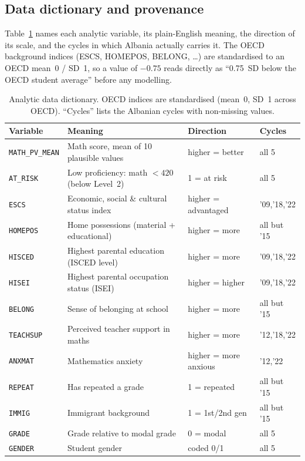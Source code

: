 \subsection{Data dictionary and provenance}
Table~\ref{tab:datadict} names each analytic variable, its plain-English meaning, the
direction of its scale, and the cycles in which Albania actually carries it. The OECD
background indices (ESCS, HOMEPOS, BELONG, \dots) are standardised to an OECD mean~0 /
SD~1, so a value of $-0.75$ reads directly as ``0.75~SD below the OECD student
average'' before any modelling.

\begin{table}[t]
\centering
\caption[Analytic data dictionary]{Analytic data dictionary. OECD indices are standardised (mean~0, SD~1
across OECD). ``Cycles'' lists the Albanian cycles with non-missing values.}
\label{tab:datadict}
\small
\begin{tabular}{@{}l p{5.1cm} l l@{}}
\toprule
Variable & Meaning & Direction & Cycles \\
\midrule
\texttt{MATH\_PV\_MEAN} & Math score, mean of 10 plausible values & higher = better & all 5 \\
\texttt{AT\_RISK} & Low proficiency: math $<420$ (below Level~2) & 1 = at risk & all 5 \\
\texttt{ESCS} & Economic, social \& cultural status index & higher = advantaged & '09,'18,'22 \\
\texttt{HOMEPOS} & Home possessions (material + educational) & higher = more & all but '15 \\
\texttt{HISCED} & Highest parental education (ISCED level) & higher = more & '09,'18,'22 \\
\texttt{HISEI} & Highest parental occupation status (ISEI) & higher = higher & '09,'18,'22 \\
\texttt{BELONG} & Sense of belonging at school & higher = more & all but '15 \\
\texttt{TEACHSUP} & Perceived teacher support in maths & higher = more & '12,'18,'22 \\
\texttt{ANXMAT} & Mathematics anxiety & higher = more anxious & '12,'22 \\
\texttt{REPEAT} & Has repeated a grade & 1 = repeated & all but '15 \\
\texttt{IMMIG} & Immigrant background & 1 = 1st/2nd gen & all but '15 \\
\texttt{GRADE} & Grade relative to modal grade & 0 = modal & all 5 \\
\texttt{GENDER} & Student gender & coded 0/1 & all 5 \\
\bottomrule
\end{tabular}
\end{table}

